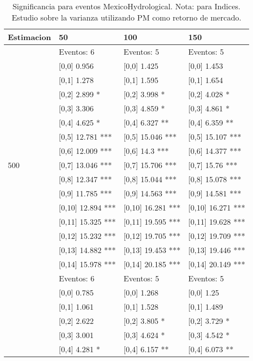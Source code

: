 \begin{table}

\caption{Significancia para eventos MexicoHydrological. Nota: para Indices. Estudio sobre la varianza utilizando PM como retorno de mercado.}
\centering
\begin{tabular}[t]{llll}
\toprule
Estimacion & 50 & 100 & 150\\
\midrule
 & Eventos:  6 & Eventos:  5 & Eventos:  5\\
 & {}[0,0] 0.956 & {}[0,0] 1.425 & {}[0,0] 1.453\\
 & {}[0,1] 1.278 & {}[0,1] 1.595 & {}[0,1] 1.654\\
 & {}[0,2] 2.899 * & {}[0,2] 3.998 * & {}[0,2] 4.028 *\\
 & {}[0,3] 3.306 & {}[0,3] 4.859 * & {}[0,3] 4.861 *\\
\addlinespace
 & {}[0,4] 4.625 * & {}[0,4] 6.327 ** & {}[0,4] 6.359 **\\
 & {}[0,5] 12.781 *** & {}[0,5] 15.046 *** & {}[0,5] 15.107 ***\\
 & {}[0,6] 12.009 *** & {}[0,6] 14.3 *** & {}[0,6] 14.377 ***\\
500 & {}[0,7] 13.046 *** & {}[0,7] 15.706 *** & {}[0,7] 15.76 ***\\
 & {}[0,8] 12.347 *** & {}[0,8] 15.044 *** & {}[0,8] 15.078 ***\\
\addlinespace
 & {}[0,9] 11.785 *** & {}[0,9] 14.563 *** & {}[0,9] 14.581 ***\\
 & {}[0,10] 12.894 *** & {}[0,10] 16.281 *** & {}[0,10] 16.271 ***\\
 & {}[0,11] 15.325 *** & {}[0,11] 19.595 *** & {}[0,11] 19.628 ***\\
 & {}[0,12] 15.232 *** & {}[0,12] 19.705 *** & {}[0,12] 19.709 ***\\
 & {}[0,13] 14.882 *** & {}[0,13] 19.453 *** & {}[0,13] 19.446 ***\\
\addlinespace
 & {}[0,14] 15.978 *** & {}[0,14] 20.185 *** & {}[0,14] 20.149 ***\\
 & Eventos:  6 & Eventos:  5 & Eventos:  5\\
 & {}[0,0] 0.785 & {}[0,0] 1.268 & {}[0,0] 1.25\\
 & {}[0,1] 1.061 & {}[0,1] 1.528 & {}[0,1] 1.489\\
 & {}[0,2] 2.622 & {}[0,2] 3.805 * & {}[0,2] 3.729 *\\
\addlinespace
 & {}[0,3] 3.001 & {}[0,3] 4.624 * & {}[0,3] 4.542 *\\
 & {}[0,4] 4.281 * & {}[0,4] 6.157 ** & {}[0,4] 6.073 **\\

\end{tabular}
\end{table}
